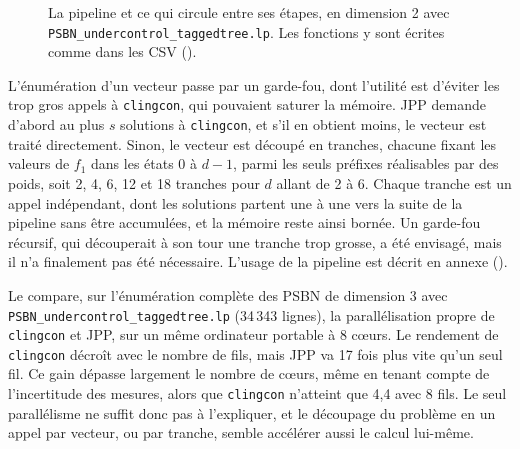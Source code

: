 \documentclass[12pt, a4paper]{article}
\begin{document}
\begin{figure}[htbp]
\caption{La pipeline et ce qui circule entre ses étapes, en dimension 2 avec \texttt{PSBN\_undercontrol\_taggedtree.lp}. Les fonctions y sont écrites comme dans les CSV ().}
\label{fig:pipeline}
\end{figure}

L'énumération d'un vecteur passe par un garde-fou, dont l'utilité est d'éviter les trop gros appels à \texttt{clingcon}, qui pouvaient saturer la mémoire.
JPP demande d'abord au plus $s$ solutions à \texttt{clingcon}, et s'il en obtient moins, le vecteur est traité directement.
Sinon, le vecteur est découpé en tranches, chacune fixant les valeurs de $f_1$ dans les états 0 à $d-1$, parmi les seuls préfixes réalisables par des poids, soit 2, 4, 6, 12 et 18 tranches pour $d$ allant de 2 à 6.
Chaque tranche est un appel indépendant, dont les solutions partent une à une vers la suite de la pipeline sans être accumulées, et la mémoire reste ainsi bornée.
Un garde-fou récursif, qui découperait à son tour une tranche trop grosse, a été envisagé, mais il n'a finalement pas été nécessaire.
L'usage de la pipeline est décrit en annexe ().

Le  compare, sur l'énumération complète des PSBN de dimension 3 avec \texttt{PSBN\_undercontrol\_taggedtree.lp} (34\,343 lignes), la parallélisation propre de \texttt{clingcon} et JPP, sur un même ordinateur portable à 8 cœurs.
Le rendement de \texttt{clingcon} décroît avec le nombre de fils, mais JPP va 17 fois plus vite qu'un seul fil.
Ce gain dépasse largement le nombre de cœurs, même en tenant compte de l'incertitude des mesures, alors que \texttt{clingcon} n'atteint que 4,4 avec 8 fils.
Le seul parallélisme ne suffit donc pas à l'expliquer, et le découpage du problème en un appel par vecteur, ou par tranche, semble accélérer aussi le calcul lui-même.
\end{document}

